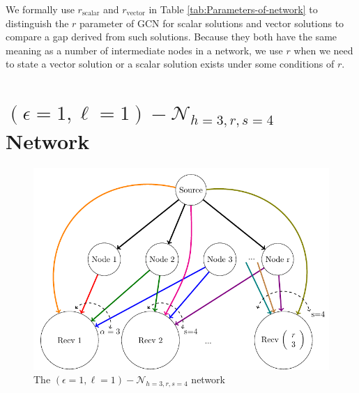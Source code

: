 We formally use $r_{\mathrm{scalar}}$ and $r_{\mathrm{vector}}$
in Table \ref{tab:Parameters-of-network} to distinguish the $r$
parameter of GCN for scalar solutions and vector solutions to compare
a gap derived from such solutions. Because they both have the same
meaning as a number of intermediate nodes in a network, we use $r$
when we need to state a vector solution or a scalar solution exists
under some conditions of $r$.

\section{$\left(\epsilon=1,\ell=1\right)-\mathcal{N}_{h=3,r,s=4}$ Network
\label{sec:Network_e1l1h3rs4}}

\begin{figure}[H]
\caption{The $(\epsilon=1,\ell=1)-\mathcal{N}_{h=3,r,s=4}$ network\label{fig:nw_e1_l1_h3_r_s4}}

\centering{}\includegraphics[width=0.5\paperwidth]{./figures/nw_e1_l1_h3_r_s4}
\end{figure}

